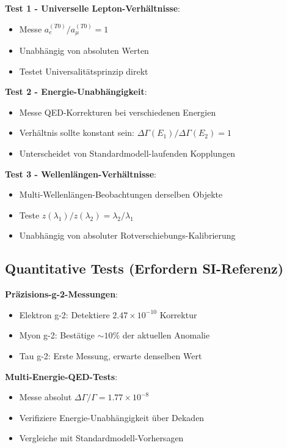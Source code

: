 \documentclass[12pt,a4paper]{article}
\theoremstyle{definition}
\theoremstyle{remark}
\begin{document}
	\textbf{Test 1 - Universelle Lepton-Verhältnisse}:
	\begin{itemize}
		\item Messe $a_e^{(T0)}/a_{\mu}^{(T0)} = 1$
		\item Unabhängig von absoluten Werten
		\item Testet Universalitätsprinzip direkt
	\end{itemize}
	
	\textbf{Test 2 - Energie-Unabhängigkeit}:
	\begin{itemize}
		\item Messe QED-Korrekturen bei verschiedenen Energien
		\item Verhältnis sollte konstant sein: $\Delta\Gamma(E_1)/\Delta\Gamma(E_2) = 1$
		\item Unterscheidet von Standardmodell-laufenden Kopplungen
	\end{itemize}
	
	\textbf{Test 3 - Wellenlängen-Verhältnisse}:
	\begin{itemize}
		\item Multi-Wellenlängen-Beobachtungen derselben Objekte
		\item Teste $z(\lambda_1)/z(\lambda_2) = \lambda_2/\lambda_1$
		\item Unabhängig von absoluter Rotverschiebungs-Kalibrierung
	\end{itemize}
	
	\subsection{Quantitative Tests (Erfordern SI-Referenz)}
	
	\textbf{Präzisions-g-2-Messungen}:
	\begin{itemize}
		\item Elektron g-2: Detektiere $2.47 \times 10^{-10}$ Korrektur
		\item Myon g-2: Bestätige $\sim 10\%$ der aktuellen Anomalie
		\item Tau g-2: Erste Messung, erwarte denselben Wert
	\end{itemize}
	
	\textbf{Multi-Energie-QED-Tests}:
	\begin{itemize}
		\item Messe absolut $\Delta\Gamma/\Gamma = 1.77 \times 10^{-8}$
		\item Verifiziere Energie-Unabhängigkeit über Dekaden
		\item Vergleiche mit Standardmodell-Vorhersagen
	\end{itemize}
	
\end{document}
